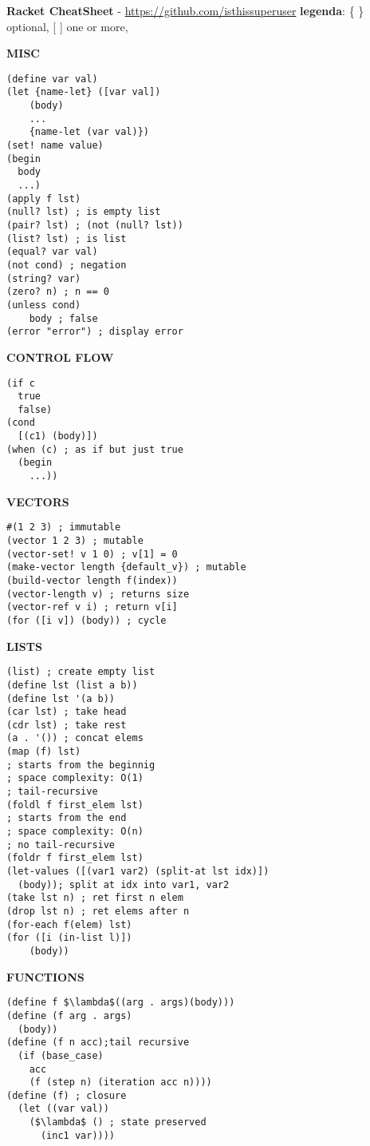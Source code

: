 \documentclass{article}
\begin{document}
\textbf{Racket CheatSheet} - \href{https://github.com/isthissuperuser}{https://github.com/isthissuperuser} \textbar{ }  \textbf{legenda}: \{ \} optional, [ ] one or more, 
\begin{multicols*}{3}

\hrulefill

\textbf{MISC}
\begin{lstlisting}
(define var val)
(let {name-let} ([var val]) 
    (body)
    ...
    {name-let (var val)})
(set! name value)
(begin
  body
  ...)
(apply f lst)
(null? lst) ; is empty list
(pair? lst) ; (not (null? lst))
(list? lst) ; is list
(equal? var val)
(not cond) ; negation
(string? var)
(zero? n) ; n == 0
(unless cond)
    body ; false
(error "error") ; display error
\end{lstlisting}

\hrulefill

\textbf{CONTROL FLOW}
\begin{lstlisting}
(if c
  true
  false)
(cond 
  [(c1) (body)])
(when (c) ; as if but just true
  (begin
    ...))
\end{lstlisting}

\hrulefill

\textbf{VECTORS}
\begin{lstlisting}
#(1 2 3) ; immutable
(vector 1 2 3) ; mutable
(vector-set! v 1 0) ; v[1] = 0
(make-vector length {default_v}) ; mutable
(build-vector length f(index))
(vector-length v) ; returns size
(vector-ref v i) ; return v[i]
(for ([i v]) (body)) ; cycle
\end{lstlisting}

\hrulefill

\textbf{LISTS}
\begin{lstlisting}
(list) ; create empty list 
(define lst (list a b))
(define lst '(a b))
(car lst) ; take head
(cdr lst) ; take rest
(a . '()) ; concat elems
(map (f) lst)
; starts from the beginnig
; space complexity: O(1)
; tail-recursive
(foldl f first_elem lst)
; starts from the end
; space complexity: O(n)
; no tail-recursive
(foldr f first_elem lst)
(let-values ([(var1 var2) (split-at lst idx)])
  (body)); split at idx into var1, var2
(take lst n) ; ret first n elem
(drop lst n) ; ret elems after n
(for-each f(elem) lst)
(for ([i (in-list l)])
    (body))
\end{lstlisting}

\hrulefill

\textbf{FUNCTIONS}
\begin{lstlisting}
(define f $\lambda$((arg . args)(body)))
(define (f arg . args)
  (body))
(define (f n acc);tail recursive
  (if (base_case)
    acc
    (f (step n) (iteration acc n))))
(define (f) ; closure
  (let ((var val))
    ($\lambda$ () ; state preserved
      (inc1 var)))) 
\end{lstlisting}


\end{multicols*}
\end{document}
